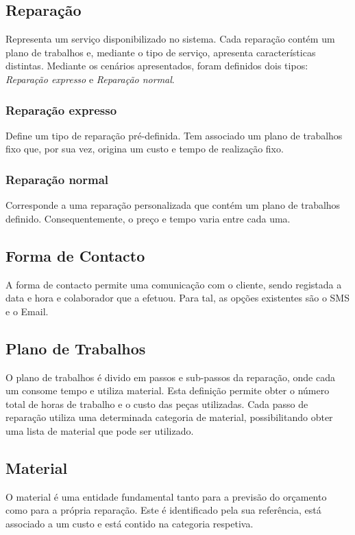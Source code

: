 \documentclass[a4paper,12pt]{scrreprt}
\begin{document}
\subsection{Reparação} \label{ent_reparacao}
Representa um serviço disponibilizado no sistema. Cada reparação contém um plano de trabalhos e,
mediante o tipo de serviço, apresenta características distintas.
Mediante os cenários apresentados, foram definidos dois tipos: \textit{Reparação expresso} e \textit{Reparação normal}.

\subsubsection{Reparação expresso} \label{ent_reparacao-expresso}
Define um tipo de reparação pré-definida.
Tem associado um plano de trabalhos fixo que, por sua vez, origina um custo e tempo de realização fixo.

\subsubsection{Reparação normal} \label{ent_reparacao-normal}
Corresponde a uma reparação personalizada que contém um plano de trabalhos definido.
Consequentemente, o preço e tempo varia entre cada uma.

\subsection{Forma de Contacto} \label{ent_formas-contacto}
A forma de contacto permite uma comunicação com o cliente, sendo registada a data e hora e colaborador que a efetuou.
Para tal, as opções existentes são o SMS e o Email.

\subsection{Plano de Trabalhos} \label{ent_plano-de-trabalhos}
O plano de trabalhos é divido em passos e sub-passos da reparação, onde cada um consome tempo e utiliza material. 
Esta definição permite obter o número total de horas de trabalho e o custo das peças utilizadas. 
Cada passo de reparação utiliza uma determinada categoria de material, possibilitando obter uma lista de material que pode ser utilizado.

\subsection{Material} \label{ent_material}
O material é uma entidade fundamental tanto para a previsão do orçamento como para a própria reparação.
Este é identificado pela sua referência, está associado a um custo e está contido na categoria respetiva.
\end{document}
